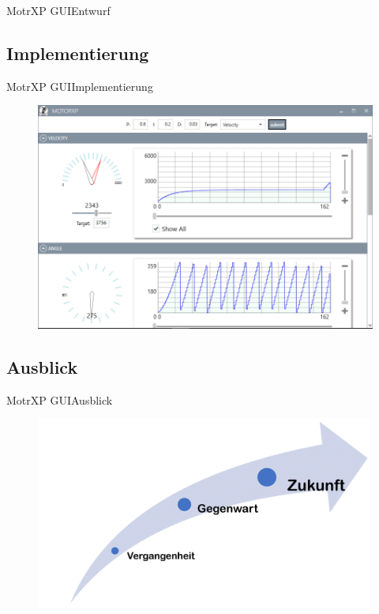 \begin{frame}{MotrXP GUI}{Entwurf}
	  		
		\end{frame}
	\subsection{Implementierung}
		\begin{frame}{MotrXP GUI}{Implementierung}
		\begin{minipage}{0.5\textwidth}
			\begin{figure}[h]
	  			\centering
	  				\includegraphics[width=\textwidth]{../gui/Bilder/GUIScreenshot2.png}
	  		\end{figure}
		\end{minipage}
	  		
		\end{frame}

	\subsection{Ausblick}
		\begin{frame}{MotrXP GUI}{Ausblick}
\begin{figure}
	  			\centering
	  				\includegraphics[width=\textwidth]{../gui/Bilder/AusblickPfeil.png}
	  		\end{figure}
		\end{frame}